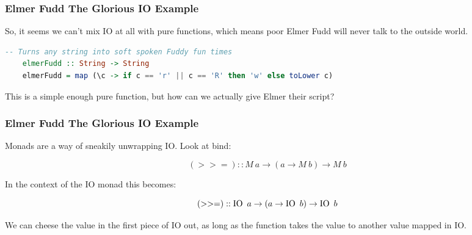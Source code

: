 \documentclass[presentation.tex]{subfiles}
\begin{document}
\begin{frame}[fragile]
  \frametitle{Elmer Fudd The Glorious IO Example}

  So, it seems we can't mix IO at all with pure functions, which means
  poor Elmer Fudd will never talk to the outside world.

  \begin{lstlisting}[frame=single,language=Haskell,breaklines=true]
    -- Turns any string into soft spoken Fuddy fun times
    elmerFudd :: String -> String
    elmerFudd = map (\c -> if c == 'r' || c == 'R' then 'w' else toLower c)
  \end{lstlisting}

  This is a simple enough pure function, but how can we actually give
  Elmer their script?
\end{frame}

\begin{frame}[fragile]
  \frametitle{Elmer Fudd The Glorious IO Example}

  Monads are a way of sneakily unwrapping IO. Look at bind:

  \[(>>=)::M\ a\rightarrow(a\rightarrow M\ b)\rightarrow M\ b\]

  In the context of the IO monad this becomes:

  \[(>>=)::\io\ a\rightarrow(a\rightarrow \io\ b)\rightarrow \io\ b\]

  We can cheese the value in the first piece of IO out, as long as the
  function takes the value to another value mapped in IO.
\end{frame}
\end{document}
